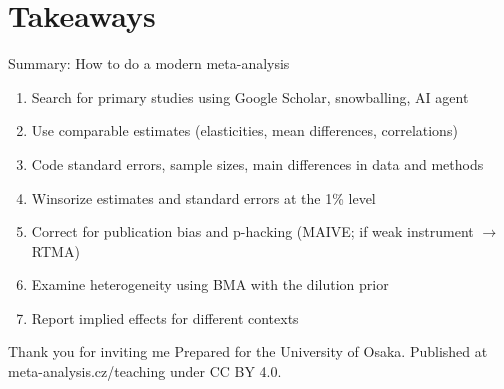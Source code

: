 \documentclass{beamer} %
\begin{document}
\section*{Takeaways}



\begin{frame}{Summary: How to do a modern meta-analysis}
\begin{enumerate}

	\item Search for primary studies using Google Scholar, snowballing, AI agent
	\item Use comparable estimates (elasticities, mean differences, correlations)
	\item Code standard errors, sample sizes, main differences in data and methods
	\item Winsorize estimates and standard errors at the 1\% level
	\item Correct for publication bias and p-hacking (MAIVE; if weak instrument $\rightarrow$ RTMA)
	\item Examine heterogeneity using BMA with the dilution prior
	\item Report implied effects for different contexts
	
\end{enumerate}
\end{frame}


\begin{frame}{Thank you for inviting me}
Prepared for the University of Osaka. Published at meta-analysis.cz/teaching under CC BY 4.0.
\end{frame}
\end{document}
